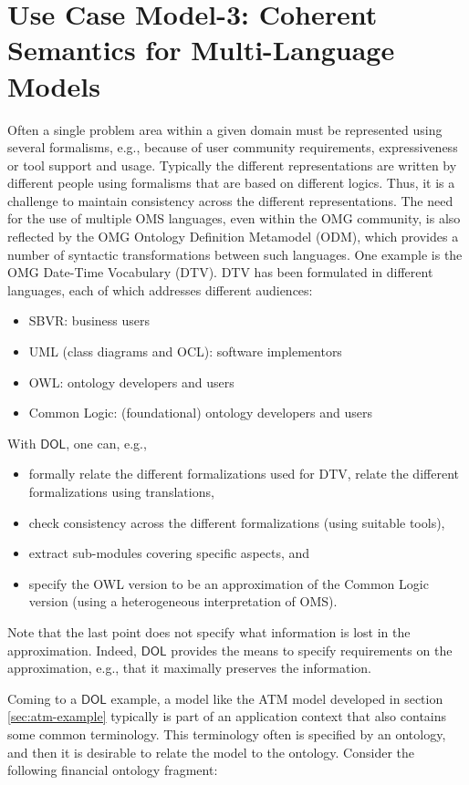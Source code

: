 \documentclass[10pt,fleqn,final]{scrreprt}
\newcommand*{\DOL}{\ensuremath{\mathsf{DOL}}\xspace}
\newenvironment{definitions}[0]{\medskip }{}
\begin{document}
\begin{definitions}
\section{Use Case Model-3: Coherent Semantics for Multi-Language Models}
\label{model-3}
	
Often a single problem area within a given domain must be represented using several formalisms, e.g., because of user community requirements, expressiveness or tool support 
and usage. 
Typically the different representations are written by different people using formalisms that are based on different logics. Thus, it is a challenge to maintain 
consistency across the different representations. 
The need for the use of multiple OMS languages, even within the OMG community, is also reflected by the OMG Ontology Definition Metamodel (ODM), which 
provides a number of syntactic transformations between such languages.
One example is the OMG Date-Time Vocabulary (DTV). DTV has been formulated in different languages, each of which addresses different audiences:
\begin{itemize}
\item	 SBVR: business users
\item 	UML (class diagrams and OCL): software implementors
\item 	OWL: ontology developers and users
\item 	Common Logic: (foundational) ontology developers and users
\end{itemize}
With \DOL, one can, e.g.,
\begin{itemize}
\item 	formally relate the different formalizations used for DTV, relate the different formalizations using translations,
\item 	check consistency across the different formalizations (using suitable tools),
\item 	extract sub-modules covering specific aspects, and
\item 	specify the OWL version to be an approximation of the Common Logic version (using a heterogeneous interpretation of OMS).
\end{itemize}
Note that the last point does not specify what information is lost in the approximation. Indeed, \DOL provides the means to specify requirements on the approximation, e.g., that it maximally preserves the information. 

Coming to a \DOL example,
a model like the ATM model developed in section \ref{sec:atm-example} typically is part of an
application context that also contains some common terminology.
This terminology often is specified by an ontology, and then
it is desirable to relate the model to the ontology. Consider
the following financial ontology fragment:


\end{definitions}
\end{document}
